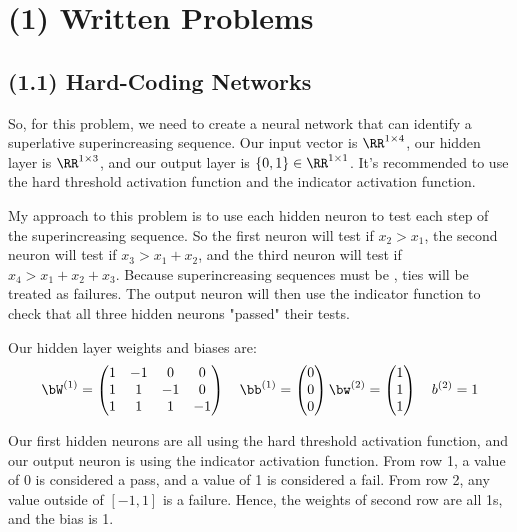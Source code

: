 \documentclass[12pt]{article}
\begin{document}
\psetheader %

\section*{(1) Written Problems}
\subsection*{(1.1) Hard-Coding Networks}
So, for this problem, we need to create a neural network that can identify a superlative superincreasing
sequence. Our input vector is $\RR^{1\times 4}$, our hidden layer is $\RR^{1\times 3}$, and our output
layer is $\{0, 1\} \in \RR^{1\times 1}$. It's recommended to use the hard threshold activation function and the indicator
activation function.

My approach to this problem is to use each hidden neuron to test each step of the superincreasing sequence.
So the first neuron will test if $x_2 > x_1$, the second neuron will test if $x_3 > x_1 + x_2$,
and the third neuron will test if $x_4 > x_1 + x_2 + x_3$. Because superincreasing sequences must be
, ties will be treated as failures. The output neuron will then use the indicator
function to check that all three hidden neurons "passed" their tests.

Our hidden layer weights and biases are:
$$
\bW^{(1)} =
\begin{pmatrix}
		1 & -1 & 0 & 0 \\
		1 & 1 & -1 & 0 \\
		1 & 1 & 1 & -1
\end{pmatrix}
\quad
\bb^{(1)} =
\begin{pmatrix}
		0 \\
		0 \\
		0
\end{pmatrix}
\bw^{(2)} =
\begin{pmatrix}
		1 \\
		1 \\
		1
\end{pmatrix}
\quad
b^{(2)} = 1
$$

Our first hidden neurons are all using the hard threshold activation function, and our output
neuron is using the indicator activation function. From row 1, a value of 0 is considered a
pass, and a value of 1 is considered a fail. From row 2, any value outside of $[-1,1]$ is
a failure. Hence, the weights of second row are all 1s, and the bias is 1.

\newpage
\end{document}
